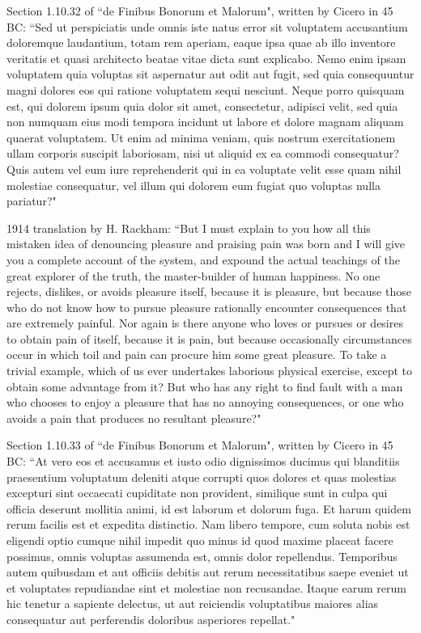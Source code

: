 Section 1.10.32 of ``de Finibus Bonorum et Malorum", written by Cicero in 45 BC: ``Sed ut perspiciatis unde omnis iste natus error sit voluptatem accusantium doloremque laudantium, totam rem aperiam, eaque ipsa quae ab illo inventore veritatis et quasi architecto beatae vitae dicta sunt explicabo. Nemo enim ipsam voluptatem quia voluptas sit aspernatur aut odit aut fugit, sed quia consequuntur magni dolores eos qui ratione voluptatem sequi nesciunt. Neque porro quisquam est, qui dolorem ipsum quia dolor sit amet, consectetur, adipisci velit, sed quia non numquam eius modi tempora incidunt ut labore et dolore magnam aliquam quaerat voluptatem. Ut enim ad minima veniam, quis nostrum exercitationem ullam corporis suscipit laboriosam, nisi ut aliquid ex ea commodi consequatur? Quis autem vel eum iure reprehenderit qui in ea voluptate velit esse quam nihil molestiae consequatur, vel illum qui dolorem eum fugiat quo voluptas nulla pariatur?"

1914 translation by H. Rackham: ``But I must explain to you how all this mistaken idea of denouncing pleasure and praising pain was born and I will give you a complete account of the system, and expound the actual teachings of the great explorer of the truth, the master-builder of human happiness. No one rejects, dislikes, or avoids pleasure itself, because it is pleasure, but because those who do not know how to pursue pleasure rationally encounter consequences that are extremely painful. Nor again is there anyone who loves or pursues or desires to obtain pain of itself, because it is pain, but because occasionally circumstances occur in which toil and pain can procure him some great pleasure. To take a trivial example, which of us ever undertakes laborious physical exercise, except to obtain some advantage from it? But who has any right to find fault with a man who chooses to enjoy a pleasure that has no annoying consequences, or one who avoids a pain that produces no resultant pleasure?"

Section 1.10.33 of ``de Finibus Bonorum et Malorum", written by Cicero in 45 BC: ``At vero eos et accusamus et iusto odio dignissimos ducimus qui blanditiis praesentium voluptatum deleniti atque corrupti quos dolores et quas molestias excepturi sint occaecati cupiditate non provident, similique sunt in culpa qui officia deserunt mollitia animi, id est laborum et dolorum fuga. Et harum quidem rerum facilis est et expedita distinctio. Nam libero tempore, cum soluta nobis est eligendi optio cumque nihil impedit quo minus id quod maxime placeat facere possimus, omnis voluptas assumenda est, omnis dolor repellendus. Temporibus autem quibusdam et aut officiis debitis aut rerum necessitatibus saepe eveniet ut et voluptates repudiandae sint et molestiae non recusandae. Itaque earum rerum hic tenetur a sapiente delectus, ut aut reiciendis voluptatibus maiores alias consequatur aut perferendis doloribus asperiores repellat."

